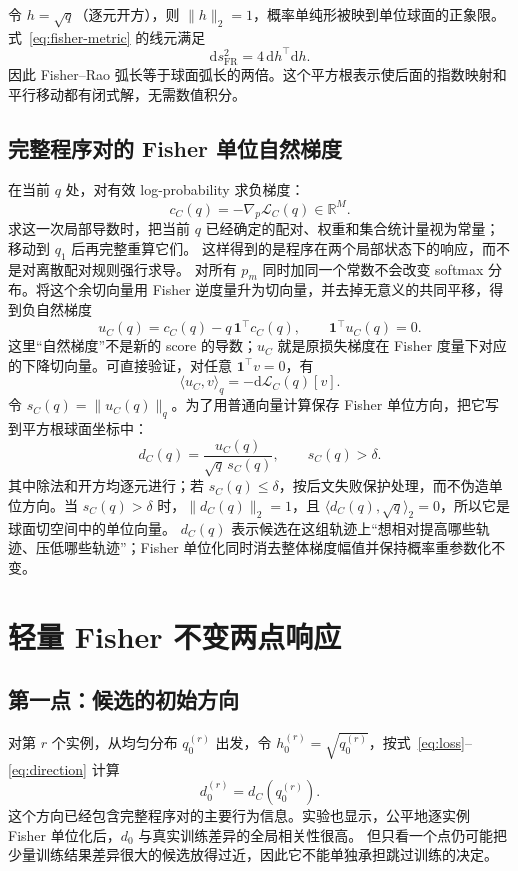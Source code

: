 \documentclass[UTF8,11pt]{ctexart}
\newcommand{\R}{\mathbb{R}}
\begin{document}
令 $h=\sqrt q$（逐元开方），则 $\lVert h\rVert_2=1$，概率单纯形被映到单位球面的正象限。式~\eqref{eq:fisher-metric} 的线元满足
\[
\mathrm ds_{\mathrm{FR}}^2=4\,\mathrm dh^\top\mathrm dh.
\]
因此 Fisher--Rao 弧长等于球面弧长的两倍。这个平方根表示使后面的指数映射和平行移动都有闭式解，无需数值积分。

\subsection{完整程序对的 Fisher 单位自然梯度}

在当前 $q$ 处，对有效 log-probability 求负梯度：
\[
c_C(q)=-\nabla_p\mathcal L_C(q)\in\R^M.
\]
求这一次局部导数时，把当前 $q$ 已经确定的配对、权重和集合统计量视为常量；移动到 $q_1$ 后再完整重算它们。
这样得到的是程序在两个局部状态下的响应，而不是对离散配对规则强行求导。
对所有 $p_m$ 同时加同一个常数不会改变 softmax 分布。将这个余切向量用 Fisher 逆度量升为切向量，并去掉无意义的共同平移，得到负自然梯度
\begin{equation}
u_C(q)=c_C(q)-q\,\bm 1^\top c_C(q),
\qquad \bm 1^\top u_C(q)=0.
\label{eq:projection}
\end{equation}
这里“自然梯度”不是新的 score 的导数；$u_C$ 就是原损失梯度在 Fisher 度量下对应的下降切向量。可直接验证，对任意 $\bm 1^\top v=0$，有
\[
\langle u_C,v\rangle_q
=-\mathrm d\mathcal L_C(q)[v].
\]
令 $s_C(q)=\lVert u_C(q)\rVert_q$。为了用普通向量计算保存 Fisher 单位方向，把它写到平方根球面坐标中：
\begin{equation}
d_C(q)=
\frac{u_C(q)}{\sqrt q\,s_C(q)},
\qquad s_C(q)>\delta.
\label{eq:direction}
\end{equation}
其中除法和开方均逐元进行；若 $s_C(q)\le\delta$，按后文失败保护处理，而不伪造单位方向。当 $s_C(q)>\delta$ 时，$\lVert d_C(q)\rVert_2=1$，且 $\langle d_C(q),\sqrt q\rangle_2=0$，所以它是球面切空间中的单位向量。
$d_C(q)$ 表示候选在这组轨迹上“想相对提高哪些轨迹、压低哪些轨迹”；Fisher 单位化同时消去整体梯度幅值并保持概率重参数化不变。

\section{轻量 Fisher 不变两点响应}

\subsection{第一点：候选的初始方向}

对第 $r$ 个实例，从均匀分布 $q_0^{(r)}$ 出发，令 $h_0^{(r)}=\sqrt{q_0^{(r)}}$，按式~\eqref{eq:loss}--\eqref{eq:direction} 计算
\[
d_0^{(r)}=d_C(q_0^{(r)}).
\]
这个方向已经包含完整程序对的主要行为信息。实验也显示，公平地逐实例 Fisher 单位化后，$d_0$ 与真实训练差异的全局相关性很高。
但只看一个点仍可能把少量训练结果差异很大的候选放得过近，因此它不能单独承担跳过训练的决定。
\end{document}
